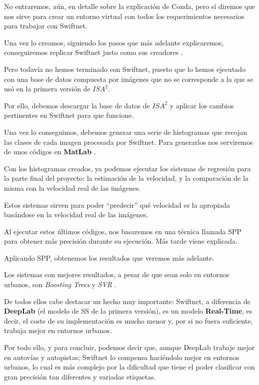 No entraremos, aún, en detalle sobre la explicación de Conda, pero sí diremos que nos sirve para crear un entorno virtual con todos los requerimientos necesarios para trabajar con Swiftnet.

Una vez lo creamos, siguiendo los pasos que más adelante explicaremos, conseguiremos replicar Swiftnet justo como sus creadores \cite{github_swiftnet}.

Pero todavía no hemos terminado con Swiftnet, puesto que lo hemos ejecutado con una base de datos compuesta por imágenes que no se corresponde a la que se usó en la primera versión de $ISA^{2}$.

Por ello, debemos descargar la base de datos de $ISA^{2}$ y aplicar los cambios pertinentes en Swiftnet para que funcione.

Una vez lo conseguimos, debemos generar una serie de histogramas \cite{histograma} que recojan las clases de cada imagen procesada por Swiftnet. Para generarlos nos serviremos de unos códigos en \textbf{MatLab} \cite{matlab}.

Con los histogramas creados, ya podemos ejecutar los sistemas de regresión para la parte final del proyecto: la estimación de la velocidad, y la comparación de la misma con la velocidad real de las imágenes.

Estos sistemas sirven para poder ``predecir'' qué velocidad es la apropiada basándose en la velocidad real de las imágenes.

Al ejecutar estos últimos códigos, nos basaremos en una técnica llamada \ac{SPP} \cite{spp} para obtener más precisión durante su ejecución. Más tarde viene explicada.

Aplicando \ac{SPP}, obtenemos los resultados que veremos más adelante.

Los sistemas con mejores resultados, a pesar de que sean solo en entornos urbanos, son \textit{Boosting Trees} \cite{boosting-trees} y \textit{\ac{SVR}} \cite{SVR}.

De todos ellos cabe destacar un hecho muy importante: Swiftnet, a diferencia de \textbf{DeepLab} (el modelo de \ac{SS} de la primera versión), es un modelo \textbf{Real-Time}, es decir, el coste de su implementación es mucho menor y, por si no fuera suficiente, trabaja mejor en entornos urbanos.

Por todo ello, y para concluir, podemos decir que, aunque DeepLab trabaje mejor en autovías y autopistas; Swiftnet lo compensa haciéndolo mejor en entornos urbanos, lo cual es más complejo por la dificultad que tiene el poder clasificar con gran precisión tan diferentes y variadas etiquetas.
